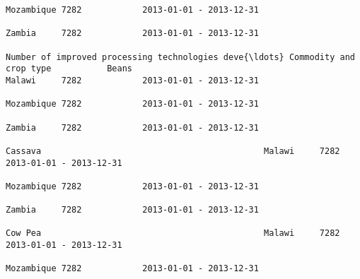 \documentclass[11pt]{article}
\begin{document}
\begin{Verbatim}[commandchars=\\\{\}]
                                                                                                                                                                                                                 Mozambique 7282            2013-01-01 - 2013-12-31   
                                                                                                                                                                                                                 Zambia     7282            2013-01-01 - 2013-12-31   
                                                                         Number of improved processing technologies deve{\ldots} Commodity and crop type           Beans                                              Malawi     7282            2013-01-01 - 2013-12-31   
                                                                                                                                                                                                                 Mozambique 7282            2013-01-01 - 2013-12-31   
                                                                                                                                                                                                                 Zambia     7282            2013-01-01 - 2013-12-31   
                                                                                                                                                              Cassava                                            Malawi     7282            2013-01-01 - 2013-12-31   
                                                                                                                                                                                                                 Mozambique 7282            2013-01-01 - 2013-12-31   
                                                                                                                                                                                                                 Zambia     7282            2013-01-01 - 2013-12-31   
                                                                                                                                                              Cow Pea                                            Malawi     7282            2013-01-01 - 2013-12-31   
                                                                                                                                                                                                                 Mozambique 7282            2013-01-01 - 2013-12-31   

\end{Verbatim}
\end{document}
